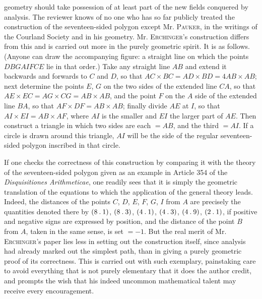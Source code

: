 geometry should take possession of at least part of the new fields conquered by analysis. The reviewer knows of no one who has so far publicly treated the construction of the seventeen-sided polygon except Mr. \textsc{Pauker}, in the writings of the Courland Society and in his geometry. Mr. \textsc{Erchinger}'s construction differs from this and is carried out more in the purely geometric spirit. It is as follows. (Anyone can draw the accompanying figure: a straight line on which the points $DBGAIFCE$ lie in that order.) Take any straight line $AB$ and extend it backwards and forwards to $C$ and $D$, so that $AC\times BC=AD\times BD=4AB\times AB$; next determine the points $E$, $G$ on the two sides of the extended line $CA$, so that $AE\times EC=AG\times CG=AB\times AB$, and the point $F$ on the $A$ side of the extended line $BA$, so that $AF\times DF=AB\times AB$; finally divide $AE$ at $I$, so that $AI\times EI=AB\times AF$, where $AI$ is the smaller and $EI$ the larger part of $AE$. Then construct a triangle in which two sides are each $=AB$, and the third $=AI$. If a circle is drawn around this triangle, $AI$ will be the side of the regular seventeen-sided polygon inscribed in that circle.

If one checks the correctness of this construction by comparing it with the theory of the seventeen-sided polygon given as an example in Article 354 of the \emph{Disquisitiones Arithmeticae}, one readily sees that it is simply the geometric translation of the equations to which the application of the general theory leads. Indeed, the distances of the points $C$, $D$, $E$, $F$, $G$, $I$ from $A$ are precisely the quantities denoted there by $(8\mathbin{.}1)$, $(8\mathbin{.}3)$, $(4\mathbin{.}1)$, $(4\mathbin{.}3)$, $(4\mathbin{.}9)$, $(2\mathbin{.}1)$, if positive and negative signs are expressed by position, and the distance of the point $B$ from $A$, taken in the same sense, is set $=-1$. But the real merit of Mr. \textsc{Erchinger}'s paper lies less in setting out the construction itself, since analysis had already marked out the simplest path, than in giving a purely geometric proof of its correctness. This is carried out with such exemplary, painstaking care to avoid everything that is not purely elementary that it does the author credit, and prompts the wish that his indeed uncommon mathematical talent may receive every encouragement.
